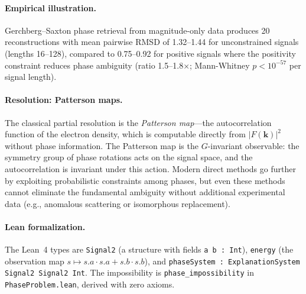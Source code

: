 \paragraph{Empirical illustration.}
Gerchberg--Saxton phase retrieval from magnitude-only data produces 20
reconstructions with mean pairwise RMSD of 1.32--1.44 for unconstrained signals
(lengths 16--128), compared to 0.75--0.92 for positive signals where the
positivity constraint reduces phase ambiguity (ratio 1.5--1.8$\times$;
Mann-Whitney $p < 10^{-57}$ per signal length).

\paragraph{Resolution: Patterson maps.}
The classical partial resolution is the \emph{Patterson map}---the
autocorrelation function of the electron density, which is computable
directly from $|F(\mathbf{k})|^2$ without phase information.  The Patterson
map is the $G$-invariant observable: the symmetry group of phase rotations
acts on the signal space, and the autocorrelation is invariant under this
action.  Modern direct methods \citep{hauptman1985} go further by exploiting
probabilistic constraints among phases, but even these methods cannot
eliminate the fundamental ambiguity without additional experimental data
(e.g., anomalous scattering or isomorphous replacement).

\paragraph{Lean formalization.}
The Lean~4 types are \texttt{Signal2} (a structure with fields
\texttt{a b : Int}), \texttt{energy} (the observation map
$s \mapsto s.a \cdot s.a + s.b \cdot s.b$), and
\texttt{phaseSystem : ExplanationSystem Signal2 Signal2 Int}.
The impossibility is \texttt{phase\_impossibility} in
\texttt{PhaseProblem.lean}, derived with zero axioms.
